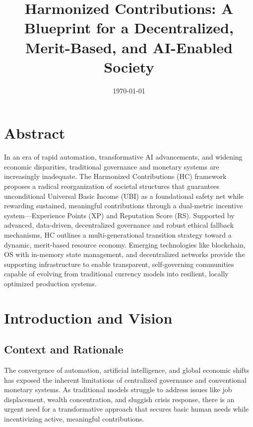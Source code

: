 \documentclass[12pt]{article}
\title{Harmonized Contributions: A Blueprint for a Decentralized, Merit-Based, and AI-Enabled Society}
\author{}
\date{\today}
\begin{document}
\maketitle

\section{Abstract}
In an era of rapid automation, transformative AI advancements, and widening economic disparities, traditional governance and monetary systems are increasingly inadequate. The Harmonized Contributions (HC) framework proposes a radical reorganization of societal structures that guarantees unconditional Universal Basic Income (UBI) as a foundational safety net while rewarding sustained, meaningful contributions through a dual-metric incentive system—Experience Points (XP) and Reputation Score (RS). Supported by advanced, data-driven, decentralized governance and robust ethical fallback mechanisms, HC outlines a multi-generational transition strategy toward a dynamic, merit-based resource economy. Emerging technologies like blockchain, OS with in-memory state management, and decentralized networks provide the supporting infrastructure to enable transparent, self-governing communities capable of evolving from traditional currency models into resilient, locally optimized production systems.
\newpage
\tableofcontents
\newpage
\section{Introduction and Vision}

\subsection{Context and Rationale}
The convergence of automation, artificial intelligence, and global economic shifts has exposed the inherent limitations of centralized governance and conventional monetary systems. As traditional models struggle to address issues like job displacement, wealth concentration, and sluggish crisis response, there is an urgent need for a transformative approach that secures basic human needs while incentivizing active, meaningful contributions.
\end{document}

